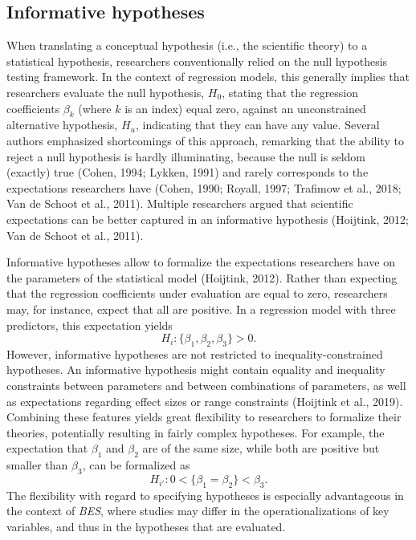 \documentclass[
]{interact}
\begin{document}
\hypertarget{informative-hypotheses}{%
\subsection{Informative hypotheses}\label{informative-hypotheses}}

When translating a conceptual hypothesis (i.e., the scientific theory)
to a statistical hypothesis, researchers conventionally relied on the
null hypothesis testing framework. In the context of regression models,
this generally implies that researchers evaluate the null hypothesis,
\(H_0\), stating that the regression coefficients \(\beta_k\) (where
\(k\) is an index) equal zero, against an unconstrained alternative
hypothesis, \(H_u\), indicating that they can have any value. Several
authors emphasized shortcomings of this approach, remarking that the
ability to reject a null hypothesis is hardly illuminating, because the
null is seldom (exactly) true (Cohen, 1994; Lykken, 1991) and rarely
corresponds to the expectations researchers have (Cohen, 1990; Royall,
1997; Trafimow et al., 2018; Van de Schoot et al., 2011). Multiple
researchers argued that scientific expectations can be better captured
in an informative hypothesis (Hoijtink, 2012; Van de Schoot et al.,
2011).

Informative hypotheses allow to formalize the expectations researchers
have on the parameters of the statistical model (Hoijtink, 2012). Rather
than expecting that the regression coefficients under evaluation are
equal to zero, researchers may, for instance, expect that all are
positive. In a regression model with three predictors, this expectation
yields \[
H_i: \{\beta_1, \beta_2, \beta_3\} > 0.
\] However, informative hypotheses are not restricted to
inequality-constrained hypotheses. An informative hypothesis might
contain equality and inequality constraints between parameters and
between combinations of parameters, as well as expectations regarding
effect sizes or range constraints (Hoijtink et al., 2019). Combining
these features yields great flexibility to researchers to formalize
their theories, potentially resulting in fairly complex hypotheses. For
example, the expectation that \(\beta_1\) and \(\beta_2\) are of the
same size, while both are positive but smaller than \(\beta_3\), can be
formalized as \[
H_{i'}: 0 < \{\beta_1=\beta_2\} < \beta_3. 
\] The flexibility with regard to specifying hypotheses is especially
advantageous in the context of \emph{BES}, where studies may differ in
the operationalizations of key variables, and thus in the hypotheses
that are evaluated.
\end{document}
